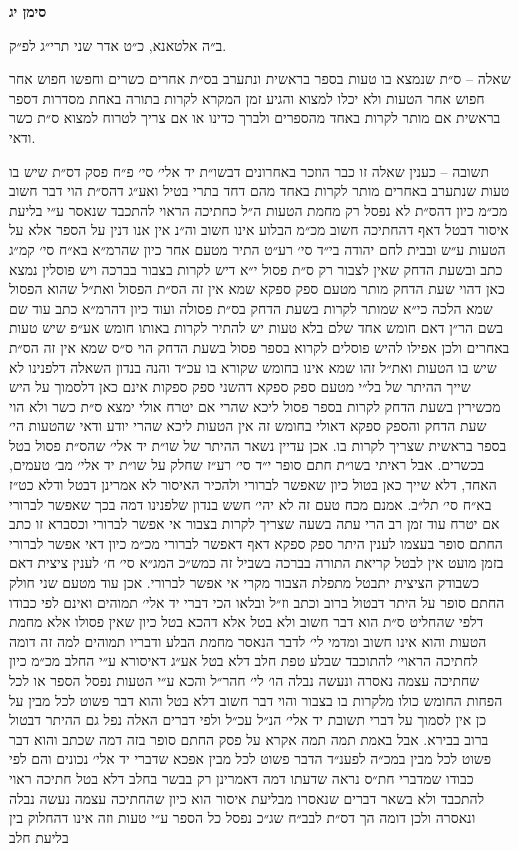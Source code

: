 \documentclass[12pt, openany]{book}
\newcommand{\chapname}{}
\newcommand{\newchap}[1]{
	\addcontentsline{toc}{chapter}{#1}
	\renewcommand{\chapname}{#1}
		\begin{center}
			\textbf{%
\fontsize{16pt}{16pt}\selectfont
				#1}
		\end{center}
}
\begin{document}
\newchap{סימן יג}
\begin{multicols}{2}
ב״ה אלטאנא, כ״ט אדר שני תרי״ג לפ״ק.\\\vspace{0pt}

שאלה – ס״ת שנמצא בו טעות בספר בראשית ונתערב בס״ת אחרים כשרים וחפשו חפוש אחר חפוש אחר הטעות ולא יכלו למצוא והגיע זמן המקרא לקרות בתורה באחת מסדרות דספר בראשית אם מותר לקרות באחד מהספרים ולברך כדינו או אם צריך לטרוח למצוא ס״ת כשר ודאי.\\\vspace{0pt}

תשובה – כענין שאלה זו כבר הוזכר באחרונים דבשו״ת יד אלי׳ סי׳ פ״ח פסק דס״ת שיש בו טעות שנתערב באחרים מותר לקרות באחד מהם דחד בתרי בטיל ואע״ג דהס״ת הוי דבר חשוב מכ״מ כיון דהס״ת לא נפסל רק מחמת הטעות ה״ל כחתיכה הראוי להתכבד שנאסר ע״י בליעת איסור דבטל דאף דהחתיכה חשוב מכ״מ הבלוע אינו חשוב וה״נ אין אנו דנין על הספר אלא על הטעות ע״ש ובבית לחם יהודה בי״ד סי׳ רע״ט התיר מטעם אחר כיון שהרמ״א בא״ח סי׳ קמ״ג כתב ובשעת הדחק שאין לצבור רק ס״ת פסול י״א דיש לקרות בצבור בברכה ויש פוסלין נמצא כאן דהוי שעת הדחק מותר מטעם ספק ספקא שמא אין זה הס״ת הפסול ואת״ל שהוא הפסול שמא הלכה כי״א שמותר לקרות בשעת הדחק בס״ת פסולה ועוד כיון דהרמ״א כתב עוד שם בשם הר״ן דאם חומש אחד שלם בלא טעות יש להתיר לקרות באותו חומש אע״פ שיש טעות באחרים ולכן אפילו להיש פוסלים לקרוא בספר פסול בשעת הדחק הוי ס״ס שמא אין זה הס״ת שיש בו הטעות ואת״ל זהו שמא אינו בחומש שקורא בו עכ״ד והנה בנדון השאלה דלפנינו לא שייך ההיתר של בל״י מטעם ספק ספקא דהשני ספק ספקות אינם כאן דלסמוך על היש מכשירין בשעת הדחק לקרות בספר פסול ליכא שהרי אם יטרח אולי ימצא ס״ת כשר ולא הוי שעת הדחק והספק ספקא דאולי בחומש זה אין הטעות ליכא שהרי יודע ודאי שהטעות הי׳ בספר בראשית שצריך לקרות בו. אכן עדיין נשאר ההיתר של שו״ת יד אלי׳ שהס״ת פסול בטל בכשרים. אבל ראיתי בשו״ת חתם סופר י״ד סי׳ רע״ז שחלק על שו״ת יד אלי׳ מב׳ טעמים, האחד, דלא שייך כאן בטול כיון שאפשר לברורי ולהכיר האיסור לא אמרינן דבטל ודלא כט״ז בא״ח סי׳ תל״ב. אמנם מכח טעם זה לא יהי׳ חשש בנדון שלפנינו דמה בכך שאפשר לברורי אם יטרח עוד זמן רב הרי עתה בשעה שצריך לקרות בצבור אי אפשר לברורי וכסברא זו כתב החתם סופר בעצמו לענין היתר ספק ספקא דאף דאפשר לברורי מכ״מ כיון דאי אפשר לברורי בזמן מועט אין לבטל קריאת התורה בברכה בשביל זה כמש״כ המג״א סי׳ ח׳ לענין ציצית דאם כשבודק הציצית יתבטל מתפלת הצבור מקרי אי אפשר לברורי. אכן עוד מטעם שני חולק החתם סופר על היתר דבטול ברוב וכתב וז״ל ובלאו הכי דברי יד אלי׳ תמוהים ואינם לפי כבודו דלפי שהחליט ס״ת הוא דבר חשוב ולא בטל אלא דהכא בטל כיון שאין פסולו אלא מחמת הטעות והוא אינו חשוב ומדמי לי׳ לדבר הנאסר מחמת הבלע ודבריו תמוהים למה זה דומה לחתיכה הראוי׳ להתוכבד שבלע טפת חלב דלא בטל אע״ג דאיסורא ע״י החלב מכ״מ כיון שחתיכה עצמה נאסרה ונעשה נבלה הו׳ לי׳ חהר״ל והכא ע״י הטעות נפסל הספר או לכל הפחות החומש כולו מלקרות בו בצבור והוי דבר חשוב דלא בטל והוא דבר פשוט לכל מבין על כן אין לסמוך על דברי תשובת יד אלי׳ הנ״ל עכ״ל ולפי דברים האלה נפל גם ההיתר דבטול ברוב בבירא. אבל באמת תמה תמה אקרא על פסק החתם סופר בזה דמה שכתב והוא דבר פשוט לכל מבין במכ״ה לפענ״ד הדבר פשוט לכל מבין אפכא שדברי יד אלי׳ נכונים והם לפי כבודו שמדברי חת״ס נראה שדעתו דמה דאמרינן רק בבשר בחלב דלא בטל חתיכה ראוי להתכבד ולא בשאר דברים שנאסרו מבליעת איסור הוא כיון שהחתיכה עצמה נעשה נבלה ונאסרה ולכן דומה הך דס״ת לבב״ח שג״כ נפסל כל הספר ע״י טעות וזה אינו דהחלוק בין בליעת חלב 
\end{multicols}
\end{document}
